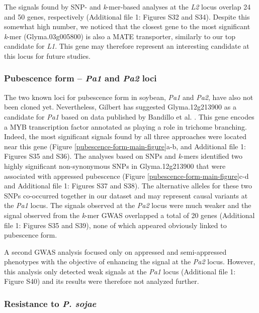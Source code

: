 \documentclass{article}
\begin{document}
The signals found by SNP- and \emph{k}-mer-based analyses at the \textit{L2}
locus overlap 24 and 50 genes, respectively (Additional file 1: Figures
S32 and S34). Despite this
somewhat high number, we noticed that the closest gene to the most significant
\emph{k}-mer (Glyma.03g005800) is also a MATE transporter, similarly to our top
candidate for \emph{L1}. This gene may therefore represent an interesting
candidate at this locus for future studies.

\subsubsection*{Pubescence form -- \textit{Pa1} and \textit{Pa2} loci}
\label{sv-gwas-main-results-pubescence-form-pa1-pa2}

The two known loci for pubescence form in soybean, \textit{Pa1} and
\textit{Pa2}, have also not been cloned yet. Nevertheless, Gilbert \cite{gilbert2017}
has suggested Glyma.12g213900 as a candidate for \textit{Pa1} based on data
published by Bandillo et al. \cite{bandillo2017}. This gene encodes a MYB transcription factor
annotated as playing a role in trichome branching. Indeed, the most significant
signals found by all three approaches were located near this gene (Figure
\ref{pubescence-form-main-figure}a-b, and Additional file 1: Figures S35 and
S36).  The analyses based on SNPs and
\emph{k}-mers identified two highly significant non-synonymous SNPs in
Glyma.12g213900 that were associated with appressed pubescence (Figure
\ref{pubescence-form-main-figure}c-d and Additional file 1: Figures S37 and
S38). The alternative alleles for these two
SNPs co-occurred together in our dataset and may represent causal variants at
the \emph{Pa1} locus. The signals observed at the \emph{Pa2} locus were much
weaker and the signal observed from the \emph{k}-mer GWAS overlapped a total of
20 genes (Additional file 1: Figures S35 and
S39), none of which appeared obviously linked
to pubescence form.

A second GWAS analysis focused only on appressed and semi-appressed phenotypes
with the objective of enhancing the signal at the \emph{Pa2} locus. However,
this analysis only detected weak signals at the \emph{Pa1} locus (Additional file 1: Figure
S40) and its results were therefore not
analyzed further.

\subsubsection*{Resistance to \textit{P. sojae}}
\end{document}
